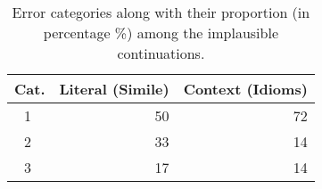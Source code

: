 
\begin{table}[t]
\centering
\small
\begin{tabular}{crr}
\toprule
\textbf{Cat.} & \textbf{Literal (Simile)} & \textbf{Context (Idioms)} \\ \hline 
 \textcircled{1} & 50 & 72 \\ 
 \textcircled{2} & 33 & 14 \\
 \textcircled{3} & 17 & 14 \\ \bottomrule
\end{tabular}
\caption{Error categories along with their proportion (in percentage \%) among the implausible continuations.}
\label{tab:error_analysis}
\end{table}


